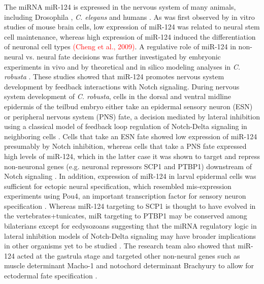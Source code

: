 \documentclass[graybox]{svmult}
\begin{document}
The miRNA miR-124 is expressed in the nervous system of many animals, including 
Drosophila \cite{Aboobaker18017}, \textit{C. elegans} \cite{Clark:2010} and 
humans \cite{Sempere2004}. As was first observed by in vitro studies of mouse 
brain cells, low expression of miR-124 was related to neural stem cell 
maintenance, whereas high expression of miR-124 induced the differentiation of 
neuronal cell types \textcolor{red}{(Cheng et al., 2009)}. A regulative role of 
miR-124 in non-neural vs. neural fate decisions was further investigated by 
embryonic experiments in vivo \cite{Chen4943} and by 
theoretical and in silico modeling analyses in \textit{C. robusta} 
\cite{Chen2014}. These studies showed that miR-124 promotes 
nervous system development by feedback interactions with Notch signaling. During 
nervous system development of \textit{C. robusta}, cells in the dorsal and 
ventral midline epidermis of the teilbud embryo either take an epidermal sensory 
neuron (ESN) or peripheral nervous system (PNS) fate, a decision mediated by 
lateral inhibition using a classical model of feedback loop regulation of 
Notch-Delta signaling in neighboring cells \cite{Collier:1996, 
Chen2014}. Cells that take an ESN fate showed low expression of miR-124 
presumably by Notch inhibition, whereas cells that take a PNS fate expressed 
high levels of miR-124, which in the latter case it was shown to target and 
repress non-neuronal genes (e.g. neuronal repressors SCP1 and PTBP1) downstream 
of Notch signaling \cite{Chen4943}. In addition, expression 
of miR-124 in larval epidermal cells was sufficient for ectopic neural 
specification, which resembled mis-expression experiments using Pou4, an 
important transcription factor for sensory neuron specification 
\cite{Chen4943, JoyceTang2013}. Whereas miR-124 targeting to SCP1 is thought to 
have evolved in the vertebrates+tunicates, miR targeting to PTBP1 may be 
conserved among bilaterians except for ecdysozoans \cite{Chen4943} suggesting 
that the miRNA regulatory logic in lateral inhibition models of Notch-Delta 
signaling may have broader implications in other organisms yet to be studied 
\cite{Chen2014}. The research team also showed that miR-124 
acted at the gastrula stage and targeted other non-neural genes such as muscle 
determinant Macho-1 and notochord determinant Brachyury to allow for ectodermal 
fate specification \cite{Chen4943}.
\end{document}
